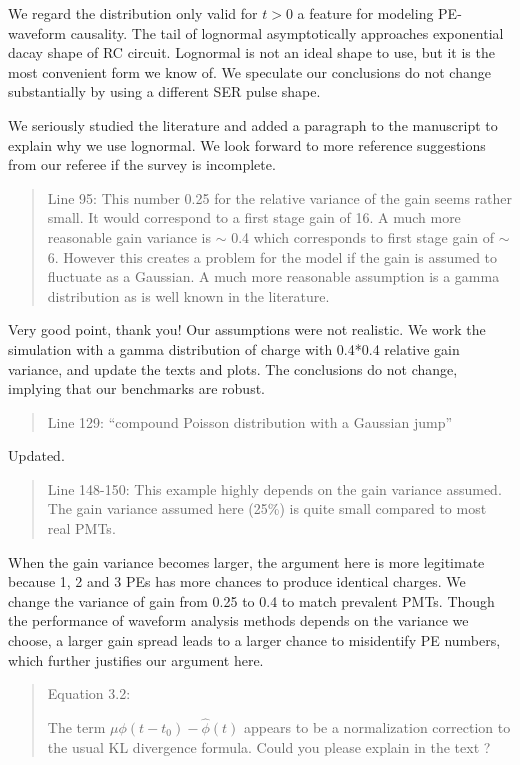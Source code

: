 \documentclass[12pt]{article}
\begin{document}
We regard the distribution only valid for $t>0$ a feature for modeling PE-waveform causality.  The tail of lognormal asymptotically approaches exponential dacay shape of RC circuit. Lognormal is not an ideal shape to use, but it is the most convenient form we know of.  We speculate our conclusions do not change substantially by using a different SER pulse shape.

We seriously studied the literature and added a paragraph to the manuscript to explain why we use lognormal.  We look forward to more reference suggestions from our referee if the survey is incomplete.

\begin{quote}
Line 95: This number 0.25 for the relative variance of the gain seems rather small. It would correspond to a first stage gain of 16. A much more reasonable gain variance is $\sim$ 0.4 which corresponds to first stage gain of $\sim$ 6. However this creates a problem for the model if the gain is assumed to fluctuate as a Gaussian. A much more reasonable assumption is a gamma distribution as is well known in the literature.
\end{quote}

Very good point, thank you!  Our assumptions were not realistic.  We work the simulation with a gamma distribution of charge with 0.4*0.4 relative gain variance, and update the texts and plots.  The conclusions do not change, implying that our benchmarks are robust. 

\begin{quote}
Line 129: ``compound Poisson distribution with a Gaussian jump''
\end{quote}

Updated.

\begin{quote}
Line 148-150: This example highly depends on the gain variance assumed. The gain variance assumed here (25\%) is quite small compared to most real PMTs.
\end{quote}

When the gain variance becomes larger, the argument here is more legitimate because 1, 2 and 3 PEs has more chances to produce identical charges. We change the variance of gain from 0.25 to 0.4 to match prevalent PMTs. Though the performance of waveform analysis methods depends on the variance we choose, a larger gain spread leads to a larger chance to misidentify PE numbers, which further justifies our argument here.

\begin{quote}
Equation 3.2:

The term $\mu\phi(t-t_0)-\hat{\phi}(t)$ appears to be a normalization correction to the usual KL divergence formula. Could you please explain in the text ?
\end{quote}
\end{document}
